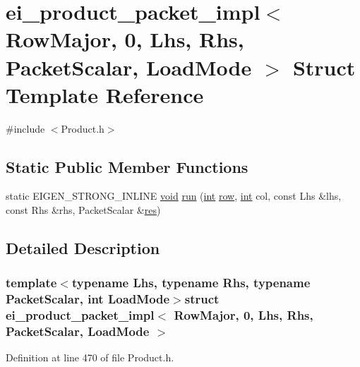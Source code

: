 \hypertarget{structei__product__packet__impl_3_01_row_major_00_010_00_01_lhs_00_01_rhs_00_01_packet_scalar_00_01_load_mode_01_4}{\section{ei\-\_\-product\-\_\-packet\-\_\-impl$<$ Row\-Major, 0, Lhs, Rhs, Packet\-Scalar, Load\-Mode $>$ Struct Template Reference}
\label{structei__product__packet__impl_3_01_row_major_00_010_00_01_lhs_00_01_rhs_00_01_packet_scalar_00_01_load_mode_01_4}
}


{\ttfamily \#include $<$Product.\-h$>$}

\subsection*{Static Public Member Functions}
\begin{DoxyCompactItemize}
\item 
static E\-I\-G\-E\-N\-\_\-\-S\-T\-R\-O\-N\-G\-\_\-\-I\-N\-L\-I\-N\-E \hyperlink{group___u_a_v_objects_plugin_ga444cf2ff3f0ecbe028adce838d373f5c}{void} \hyperlink{structei__product__packet__impl_3_01_row_major_00_010_00_01_lhs_00_01_rhs_00_01_packet_scalar_00_01_load_mode_01_4_ae695063bac9e7a762f10be4e9cc6192a}{run} (\hyperlink{ioapi_8h_a787fa3cf048117ba7123753c1e74fcd6}{int} \hyperlink{glext_8h_a11b277b422822f784ee248b43eee3e1e}{row}, \hyperlink{ioapi_8h_a787fa3cf048117ba7123753c1e74fcd6}{int} col, const Lhs \&lhs, const Rhs \&rhs, Packet\-Scalar \&\hyperlink{glext_8h_a1dbb21208b9047cc8031ca9c840d3c2f}{res})
\end{DoxyCompactItemize}


\subsection{Detailed Description}
\subsubsection*{template$<$typename Lhs, typename Rhs, typename Packet\-Scalar, int Load\-Mode$>$struct ei\-\_\-product\-\_\-packet\-\_\-impl$<$ Row\-Major, 0, Lhs, Rhs, Packet\-Scalar, Load\-Mode $>$}



Definition at line 470 of file Product.\-h.



